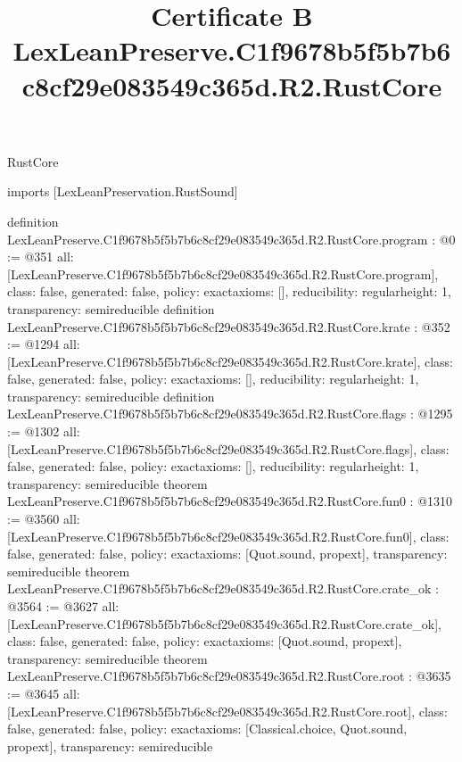 \begin{lexlean}{RustCore}
\title{Certificate B LexLeanPreserve.C1f9678b5f5b7b6c8cf29e083549c365d.R2.RustCore}
\begin{coremodule}
imports [LexLeanPreservation.RustSound]

definition LexLeanPreserve.C1f9678b5f5b7b6c8cf29e083549c365d.R2.RustCore.program : @0 := @351 {
  all: [LexLeanPreserve.C1f9678b5f5b7b6c8cf29e083549c365d.R2.RustCore.program],
  class: false,
  generated: false,
  policy: exact{axioms: []},
  reducibility: regular{height: 1},
  transparency: semireducible
}
definition LexLeanPreserve.C1f9678b5f5b7b6c8cf29e083549c365d.R2.RustCore.krate : @352 := @1294 {
  all: [LexLeanPreserve.C1f9678b5f5b7b6c8cf29e083549c365d.R2.RustCore.krate],
  class: false,
  generated: false,
  policy: exact{axioms: []},
  reducibility: regular{height: 1},
  transparency: semireducible
}
definition LexLeanPreserve.C1f9678b5f5b7b6c8cf29e083549c365d.R2.RustCore.flags : @1295 := @1302 {
  all: [LexLeanPreserve.C1f9678b5f5b7b6c8cf29e083549c365d.R2.RustCore.flags],
  class: false,
  generated: false,
  policy: exact{axioms: []},
  reducibility: regular{height: 1},
  transparency: semireducible
}
theorem LexLeanPreserve.C1f9678b5f5b7b6c8cf29e083549c365d.R2.RustCore.fun0 : @1310 := @3560 {
  all: [LexLeanPreserve.C1f9678b5f5b7b6c8cf29e083549c365d.R2.RustCore.fun0],
  class: false,
  generated: false,
  policy: exact{axioms: [Quot.sound, propext]},
  transparency: semireducible
}
theorem LexLeanPreserve.C1f9678b5f5b7b6c8cf29e083549c365d.R2.RustCore.crate_ok : @3564 := @3627 {
  all: [LexLeanPreserve.C1f9678b5f5b7b6c8cf29e083549c365d.R2.RustCore.crate_ok],
  class: false,
  generated: false,
  policy: exact{axioms: [Quot.sound, propext]},
  transparency: semireducible
}
theorem LexLeanPreserve.C1f9678b5f5b7b6c8cf29e083549c365d.R2.RustCore.root : @3635 := @3645 {
  all: [LexLeanPreserve.C1f9678b5f5b7b6c8cf29e083549c365d.R2.RustCore.root],
  class: false,
  generated: false,
  policy: exact{axioms: [Classical.choice, Quot.sound, propext]},
  transparency: semireducible
}


\end{coremodule}
\end{lexlean}
